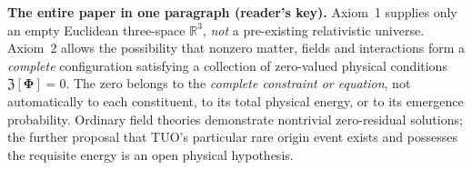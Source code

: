 \documentclass[11pt,a4paper]{article}
\newcommand{\R}{\mathbb{R}}
\newcommand{\cZ}{\mathfrak Z}
\theoremstyle{tmon}
\theoremstyle{definition}
\begin{document}
\begin{abstract}
 The v1.15 post-N006 integration audit makes explicit that the exact flat-space virial invariant is shared by both N005 and N006 regimes, whereas neither fixed-space fluid motion nor a time-symmetric gravitational constraint slice constitutes a source-derived positive-Hubble Einstein--Boltzmann history. This edition adds the full N006 convergence and closure diagnostics and an operational same-source M1--M3 proof specification; it reports no new microscopic collision solution or N007 discovery.
\end{abstract}

\begin{axiombox}
\textbf{The entire paper in one paragraph (reader's key).} Axiom~1 supplies only an empty Euclidean three-space $\R^3$, \emph{not} a pre-existing relativistic universe. Axiom~2 allows the possibility that nonzero matter, fields and interactions form a \emph{complete} configuration satisfying a collection of zero-valued physical conditions $\cZ[\bm\Phi]=0$. The zero belongs to the \emph{complete constraint or equation}, not automatically to each constituent, to its total physical energy, or to its emergence probability. Ordinary field theories demonstrate nontrivial zero-residual solutions; the further proposal that TUO's particular rare origin event exists and possesses the requisite energy is an open physical hypothesis.
\end{axiombox}
\end{document}
